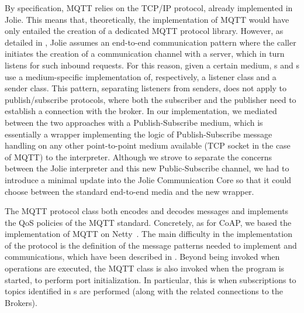 By specification, MQTT relies on the TCP/IP protocol, already implemented in
Jolie. This means that, theoretically, the implementation of MQTT would have
only entailed the creation of a dedicated MQTT protocol library. However, as
detailed in , Jolie assumes an end-to-end
communication pattern where the caller initiates the creation of a
communication channel with a server, which in turn listens for such inbound
requests. For this reason, given a certain medium, s and
s use a medium-specific implementation of, respectively, a
listener class and a sender class.
%
This pattern, separating listeners from senders, does not apply to
publish/subscribe protocols, where both the subscriber and the publisher need
to establish a connection with the broker. In our implementation, we mediated
between the two approaches with a Publish-Subscribe medium, which is
essentially a wrapper implementing the logic of Publish-Subscribe message
handling on any other point-to-point medium available (TCP socket in the case
of MQTT) to the interpreter. Although we strove to separate the concerns
between the Jolie interpreter and this new Public-Subscribe channel, we had to
introduce a minimal update into the Jolie Communication Core so that it could
choose between the standard end-to-end media and the new wrapper.

The MQTT protocol class both encodes and decodes messages and implements the QoS
policies of the MQTT standard. Concretely, as for CoAP, we based the
implementation of MQTT on Netty~\cite{maurer16}. The main difficulty in the
implementation of the protocol is the definition of the message patterns needed
to implement  and  communications, which have
been described in . Beyond being invoked when operations are executed, the
MQTT class is also invoked when the program is started, to perform port
initialization. In particular, this is when subscriptions to topics identified
in s are performed (along with the related connections to the
Brokers).
